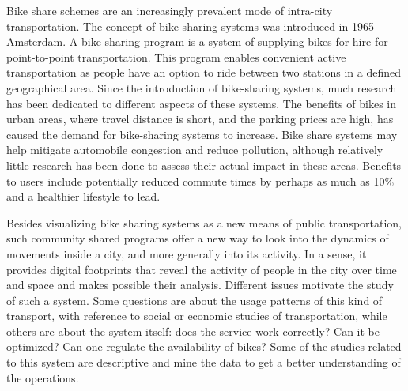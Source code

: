 \label{sec:overview}
Bike share schemes are an increasingly prevalent mode of intra-city transportation. The concept of bike sharing systems was introduced in 1965 Amsterdam. A bike sharing program is a system of supplying bikes for hire for point-to-point transportation. This program enables convenient active transportation as people have an option to ride between two stations in a defined geographical area. Since the introduction of bike-sharing systems, much research has been dedicated to different aspects of these systems. The benefits of bikes in urban areas, where travel distance is short, and the parking prices are high, has caused the demand for bike-sharing systems to increase. Bike share systems may help mitigate automobile congestion and reduce pollution, although relatively little research has been done to assess their actual impact in these areas. Benefits to users include potentially reduced commute times by perhaps as much as 10\% \cite{Sakari:2013:Data} and a healthier lifestyle to lead. 
 
Besides visualizing bike sharing systems as a new means of public transportation, such community shared programs offer a new way to look into the dynamics of movements inside a city, and more generally into its activity. In a sense, it provides digital footprints that reveal the activity of people in the city over time and space and makes possible their analysis. Different issues motivate the study of such a system. Some questions are about the usage patterns of this kind of transport, with reference to social or economic studies of transportation, while others are about the system itself: does the service work correctly? Can it be optimized? Can one regulate the availability of bikes? Some of the studies related to this system are descriptive and mine the data to get a better understanding of the operations. 

